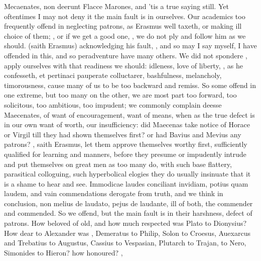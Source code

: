 {{Mecaenates, non deerunt Flacce Marones}, and 'tis a true saying still.
Yet oftentimes I may not deny it the main fault is in ourselves. Our
academics too frequently offend in neglecting patrons, as Erasmus
well taxeth, or making ill choice of them; , or if we get a good one, , we do not ply and follow him as we should.
 (saith Erasmus) acknowledging his fault,
, and so may I say myself, I have offended
in this, and so peradventure have many others. We did not spondere
, apply ourselves with
that readiness we should: idleness, love of liberty, , as he confesseth, et
pertinaci pauperate colluctarer, bashfulness, melancholy, timorousness,
cause many of us to be too backward and remiss. So some offend in one
extreme, but too many on the other, we are most part too forward, too
solicitous, too ambitious, too impudent; we commonly complain deesse
Maecenates, of want of encouragement, want of means, when as the true
defect is in our own want of worth, our insufficiency: did Maecenas
take notice of Horace or Virgil till they had shown themselves first?
or had Bavius and Mevius any patrons? , saith
Erasmus, let them approve themselves worthy first, sufficiently
qualified for learning and manners, before they presume or impudently
intrude and put themselves on great men as too many do, with such base
flattery, parasitical colloguing, such hyperbolical elogies they do
usually insinuate that it is a shame to hear and see. Immodicae laudes
conciliant invidiam, potius quam laudem, and vain commendations
derogate from truth, and we think in conclusion, non melius de laudato,
pejus de laudante, ill of both, the commender and commended. So we
offend, but the main fault is in their harshness, defect of patrons.
How beloved of old, and how much respected was Plato to Dionysius? How
dear to Alexander was \Aristotle, Demeratus to Philip, Solon to Croesus,
Auexarcus and Trebatius to Augustus, Cassius to Vespasian, Plutarch to
Trajan, \Seneca to Nero, Simonides to Hieron? how honoured?
,

}
